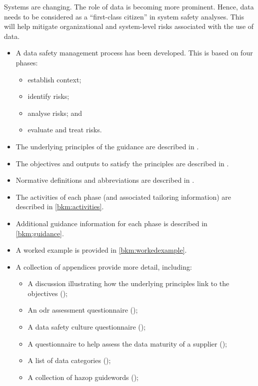 Systems are changing. The role of data is becoming more prominent. Hence, data needs to be considered as a ``first-class citizen'' in system safety analyses. This will help mitigate organizational and system-level risks associated with the use of data.
	
\begin{itemize}
	\item A data safety management process has been developed. This is based on four phases:
	\begin{itemize}
		\item establish context;
		\item identify risks;
		\item analyse risks; and
		\item evaluate and \gls{treat} risks.
	\end{itemize}
\cbstart
	\item The underlying principles of the guidance are described in .
	\item The objectives and outputs to satisfy the principles are described in .
	\item Normative definitions and abbreviations are described in .
	\item The activities of each phase (and associated \gls{tailoring} \gls{information}) are described in \autoref{bkm:activities}.
	\item Additional guidance \gls{information} for each phase is described in \autoref{bkm:guidance}.
	\item A worked example is provided in \autoref{bkm:workedexample}.
	\item A collection of appendices provide more detail, including:
	\begin{itemize}
		\item A discussion illustrating how the underlying principles link to the objectives (); 
		\item An \gls{odr} assessment questionnaire ();
		\item A data safety culture questionnaire ();
		\item A questionnaire to help assess the data maturity of a supplier ();
		\item A list of data categories ();
		\item A collection of \gls{hazop} guidewords ();

\end{itemize}
\end{itemize}

